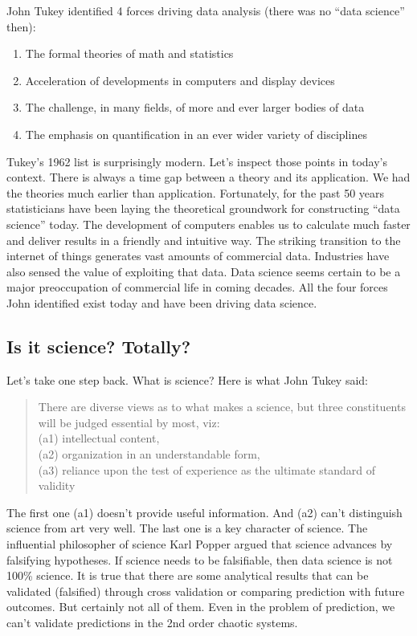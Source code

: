 \documentclass[
]{article}
\providecommand{\tightlist}{%
  \setlength{\itemsep}{0pt}\setlength{\parskip}{0pt}}
\begin{document}
John Tukey identified 4 forces driving data analysis (there was no
``data science'' then):

\begin{enumerate}
\def\labelenumi{\arabic{enumi}.}
\tightlist
\item
  The formal theories of math and statistics
\item
  Acceleration of developments in computers and display devices
\item
  The challenge, in many fields, of more and ever larger bodies of data
\item
  The emphasis on quantification in an ever wider variety of disciplines
\end{enumerate}

Tukey's 1962 list is surprisingly modern. Let's inspect those points in
today's context. There is always a time gap between a theory and its
application. We had the theories much earlier than application.
Fortunately, for the past 50 years statisticians have been laying the
theoretical groundwork for constructing ``data science'' today. The
development of computers enables us to calculate much faster and deliver
results in a friendly and intuitive way. The striking transition to the
internet of things generates vast amounts of commercial data. Industries
have also sensed the value of exploiting that data. Data science seems
certain to be a major preoccupation of commercial life in coming
decades. All the four forces John identified exist today and have been
driving data science.

\hypertarget{is-it-science-totally}{%
\subsection{Is it science? Totally?}\label{is-it-science-totally}}

Let's take one step back. What is science? Here is what John Tukey said:

\begin{quote}
There are diverse views as to what makes a science, but three
constituents will be judged essential by most, viz:\\
(a1) intellectual content,\\
(a2) organization in an understandable form,\\
(a3) reliance upon the test of experience as the ultimate standard of
validity
\end{quote}

The first one (a1) doesn't provide useful information. And (a2) can't
distinguish science from art very well. The last one is a key character
of science. The influential philosopher of science Karl Popper argued
that science advances by falsifying hypotheses. If science needs to be
falsifiable, then data science is not 100\% science. It is true that
there are some analytical results that can be validated (falsified)
through cross validation or comparing prediction with future outcomes.
But certainly not all of them. Even in the problem of prediction, we
can't validate predictions in the 2nd order chaotic systems.
\end{document}
